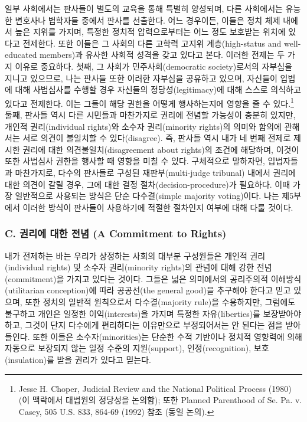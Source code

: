 \documentclass[a4paper,12pt,oneside]{article}  %
\begin{document}
일부 사회에서는 판사들이 별도의 교육을 통해 특별히 양성되며, 다른
사회에서는 유능한 변호사나 법학자들 중에서 판사를 선출한다. 어느
경우이든, 이들은 정치 체제 내에서 높은 지위를 가지며, 특정한 정치적
압력으로부터는 어느 정도 보호받는 위치에 있다고 전제한다. 또한 이들은 그
사회의 다른 고학력 고지위 계층(high-status and well-educated members)과
유사한 사회적 성격을 갖고 있다고 본다. 이러한 전제는 두 가지 이유로
중요하다. 첫째, 그 사회가 민주사회(democratic society)로서의 자부심을
지니고 있으므로, 나는 판사들 또한 이러한 자부심을 공유하고 있으며,
자신들이 입법에 대해 사법심사를 수행할 경우 자신들의
정당성(legitimacy)에 대해 스스로 의식하고 있다고 전제한다. 이는 그들이
해당 권한을 어떻게 행사하는지에 영향을 줄 수 있다.\footnote{Jesse H.
  Choper, Judicial Review and the National Political Process (1980) (이
  맥락에서 대법원의 정당성을 논의함); 또한 Planned Parenthood of Se. Pa.
  v. Casey, 505 U.S. 833, 864-69 (1992) 참조 (동일 논의).} 둘째, 판사들
역시 다른 시민들과 마찬가지로 권리에 전념할 가능성이 충분히 있지만,
개인적 권리(individual rights)와 소수자 권리(minority rights)의 의미와
함의에 관해서는 서로 의견이 불일치할 수 있다(disagree). 즉, 판사들 역시
내가 네 번째 전제로 제시한 권리에 대한 의견불일치(disagreement about
rights)의 조건에 해당하며, 이것이 또한 사법심사 권한을 행사할 때 영향을
미칠 수 있다. 구체적으로 말하자면, 입법자들과 마찬가지로, 다수의
판사들로 구성된 재판부(multi-judge tribunal) 내에서 권리에 대한 의견이
갈릴 경우, 그에 대한 결정 절차(decision-procedure)가 필요하다. 이때 가장
일반적으로 사용되는 방식은 단순 다수결(simple majority voting)이다. 나는
제5부에서 이러한 방식이 판사들이 사용하기에 적절한 절차인지 여부에 대해
다룰 것이다.

\subsubsection{C. 권리에 대한 전념 (A Commitment to
Rights)}\label{c.-uxad8cuxb9acuxc5d0-uxb300uxd55c-uxc804uxb150-a-commitment-to-rights}

내가 전제하는 바는 우리가 상정하는 사회의 대부분 구성원들은 개인적
권리(individual rights) 및 소수자 권리(minority rights)의 관념에 대해
강한 전념(commitment)을 가지고 있다는 것이다. 그들은 넓은 의미에서의
공리주의적 이해방식(utilitarian conception)에 따라 공공선(the general
good)을 추구해야 한다고 믿고 있으며, 또한 정치의 일반적 원칙으로서
다수결(majority rule)을 수용하지만, 그럼에도 불구하고 개인은 일정한
이익(interests)을 가지며 특정한 자유(liberties)를 보장받아야 하고,
그것이 단지 다수에게 편리하다는 이유만으로 부정되어서는 안 된다는 점을
받아들인다. 또한 이들은 소수자(minorities)는 단순한 수적 기반이나 정치적
영향력에 의해 자동으로 보장되지 않는 일정 수준의 지원(support),
인정(recognition), 보호(insulation)를 받을 권리가 있다고 믿는다.
\end{document}
